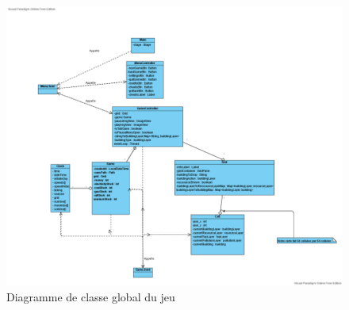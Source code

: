 \begin{figure}[H] %
    \centering
    \includegraphics[width=1\linewidth]{images/classGlobal.png}
    \caption{Diagramme de classe global du jeu}
    \label{fig:classGlobal}
\end{figure}